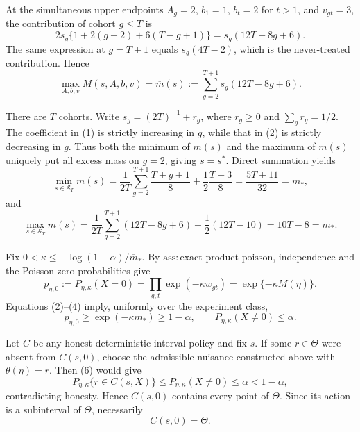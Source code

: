 At the simultaneous upper endpoints \(A_g=2\), \(b_1=1\), \(b_t=2\) for \(t>1\), and \(v_{gt}=3\), the contribution of cohort \(g\le T\) is
\[
 2s_g\{1+2(g-2)+6(T-g+1)\}
 =s_g(12T-8g+6).
\]
The same expression at \(g=T+1\) equals \(s_g(4T-2)\), which is the never-treated contribution.  Hence
\[
 \max_{A,b,v}M(s,A,b,v)
 =\overline m(s):=\sum_{g=2}^{T+1}s_g(12T-8g+6).
\tag{2}
\]

There are \(T\) cohorts.  Write \(s_g=(2T)^{-1}+r_g\), where \(r_g\ge0\) and \(\sum_gr_g=1/2\).  The coefficient in (1) is strictly increasing in \(g\), while that in (2) is strictly decreasing in \(g\).  Thus both the minimum of \(m(s)\) and the maximum of \(\overline m(s)\) uniquely put all excess mass on \(g=2\), giving \(s=s^*\).  Direct summation yields
\[
 \min_{s\in\mathcal S_T}m(s)
 =\frac{1}{2T}\sum_{g=2}^{T+1}\frac{T+g+1}{8}
   +\frac12\frac{T+3}{8}
 =\frac{5T+11}{32}=m_*,
\tag{3}
\]
and
\[
 \max_{s\in\mathcal S_T}\overline m(s)
 =\frac{1}{2T}\sum_{g=2}^{T+1}(12T-8g+6)
   +\frac12(12T-10)
 =10T-8=\overline m_*.
\tag{4}
\]

Fix \(0<\kappa\le-\log(1-\alpha)/\overline m_*\).  By \(\mathrm{ass{:}exact\text{-}product\text{-}poisson}\), independence and the Poisson zero probabilities give
\[
 p_{\eta,0}:=P_{\eta,\kappa}(X=0)
 =\prod_{g,t}\exp(-\kappa w_{gt})
 =\exp\{-\kappa M(\eta)\}.
\tag{5}
\]
Equations (2)--(4) imply, uniformly over the experiment class,
\[
 p_{\eta,0}\ge \exp(-\kappa\overline m_*)\ge1-\alpha,
 \qquad P_{\eta,\kappa}(X\ne0)\le\alpha.
\tag{6}
\]

Let \(C\) be any honest deterministic interval policy and fix \(s\).  If some \(r\in\Theta\) were absent from \(C(s,0)\), choose the admissible nuisance constructed above with \(\theta(\eta)=r\).  Then (6) would give
\[
 P_{\eta,\kappa}\{r\in C(s,X)\}
 \le P_{\eta,\kappa}(X\ne0)
 \le\alpha<1-\alpha,
\]
contradicting honesty.  Hence \(C(s,0)\) contains every point of \(\Theta\).  Since its action is a subinterval of \(\Theta\), necessarily
\[
 C(s,0)=\Theta.
\tag{7}
\]

